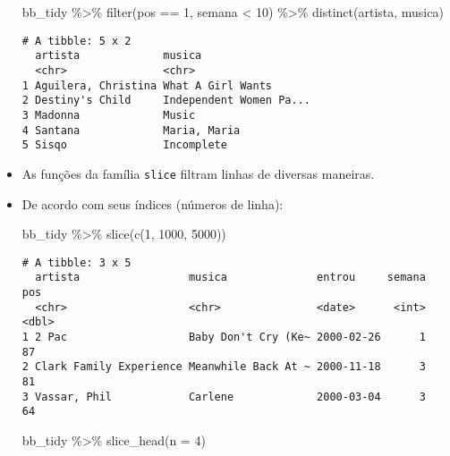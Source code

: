 \documentclass[
  letterpaper,
  DIV=11,
  numbers=noendperiod]{scrreprt}
\newenvironment{Shaded}{\begin{snugshade}}{\end{snugshade}}
\newcommand{\AttributeTok}[1]{\textcolor[rgb]{0.40,0.45,0.13}{#1}}
\newcommand{\DecValTok}[1]{\textcolor[rgb]{0.68,0.00,0.00}{#1}}
\newcommand{\FunctionTok}[1]{\textcolor[rgb]{0.28,0.35,0.67}{#1}}
\newcommand{\NormalTok}[1]{\textcolor[rgb]{0.00,0.23,0.31}{#1}}
\newcommand{\SpecialCharTok}[1]{\textcolor[rgb]{0.37,0.37,0.37}{#1}}
\begin{document}
\begin{itemize}
\begin{Shaded}
\begin{Highlighting}[]
\NormalTok{bb\_tidy }\SpecialCharTok{\%\textgreater{}\%} 
  \FunctionTok{filter}\NormalTok{(pos }\SpecialCharTok{==} \DecValTok{1}\NormalTok{, semana }\SpecialCharTok{\textless{}} \DecValTok{10}\NormalTok{) }\SpecialCharTok{\%\textgreater{}\%} 
  \FunctionTok{distinct}\NormalTok{(artista, musica)}
\end{Highlighting}
\end{Shaded}

\begin{verbatim}
# A tibble: 5 x 2
  artista             musica                 
  <chr>               <chr>                  
1 Aguilera, Christina What A Girl Wants      
2 Destiny's Child     Independent Women Pa...
3 Madonna             Music                  
4 Santana             Maria, Maria           
5 Sisqo               Incomplete             
\end{verbatim}
\item
  As funções da família \texttt{slice} filtram linhas de diversas
  maneiras.
\item
  De acordo com seus índices (números de linha):

\begin{Shaded}
\begin{Highlighting}[]
\NormalTok{bb\_tidy }\SpecialCharTok{\%\textgreater{}\%} 
  \FunctionTok{slice}\NormalTok{(}\FunctionTok{c}\NormalTok{(}\DecValTok{1}\NormalTok{, }\DecValTok{1000}\NormalTok{, }\DecValTok{5000}\NormalTok{))}
\end{Highlighting}
\end{Shaded}

\begin{verbatim}
# A tibble: 3 x 5
  artista                 musica              entrou     semana   pos
  <chr>                   <chr>               <date>      <int> <dbl>
1 2 Pac                   Baby Don't Cry (Ke~ 2000-02-26      1    87
2 Clark Family Experience Meanwhile Back At ~ 2000-11-18      3    81
3 Vassar, Phil            Carlene             2000-03-04      3    64
\end{verbatim}

\begin{Shaded}
\begin{Highlighting}[]
\NormalTok{bb\_tidy }\SpecialCharTok{\%\textgreater{}\%} 
  \FunctionTok{slice\_head}\NormalTok{(}\AttributeTok{n =} \DecValTok{4}\NormalTok{)}
\end{Highlighting}
\end{Shaded}


\end{itemize}
\end{document}
